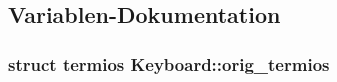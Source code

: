 \subsection{Variablen-\/Dokumentation}
\hypertarget{namespace_keyboard_a8b623d5192e406c97c4e265dbe4c5f38}{
\subsubsection[{orig\_\-termios}]{\setlength{\rightskip}{0pt plus 5cm}struct termios {\bf Keyboard::orig\_\-termios}}}
\label{namespace_keyboard_a8b623d5192e406c97c4e265dbe4c5f38}
